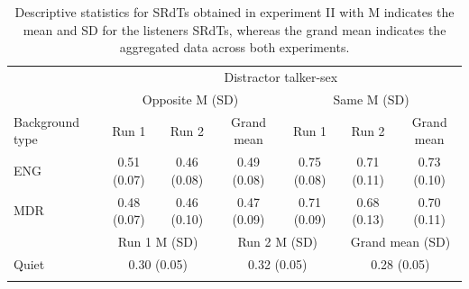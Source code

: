 \documentclass[a4paper, twoside]{templates/ociamthesis}
\begin{document}
\begin{table}[ht]
\caption{\label{tab:Test-RetestDiscriptive}{Descriptive statistics for SRdTs obtained in experiment II with M indicates the mean and SD for the listeners SRdTs, whereas the grand mean indicates the aggregated data across both experiments.}}
\renewcommand{\arraystretch}{2}
\begin{tabular}{lcccccc}
\hline \hline
                & \multicolumn{6}{c}{Distractor talker-sex}                                                      \\
                & \multicolumn{3}{c}{Opposite M (SD)}            & \multicolumn{3}{c}{Same M (SD)}                    \\ \cline{2-7} 
Background type & Run 1           & Run 2          & Grand mean      & Run 1          & Run 2             & Grand mean        \\ \hline
ENG             & 0.51 (0.07)     & 0.46 (0.08)    & 0.49 (0.08)     & 0.75 (0.08)    & 0.71 (0.11)       & 0.73 (0.10)       \\
MDR             & 0.48 (0.07)     & 0.46 (0.10)    & 0.47 (0.09)     & 0.71 (0.09)    & 0.68 (0.13)       & 0.70 (0.11)       \\ \hline
                & \multicolumn{2}{c}{Run 1 M (SD)} & \multicolumn{2}{c}{Run 2 M (SD)} & \multicolumn{2}{c}{Grand mean (SD)} \\ \cline{2-7} 
Quiet           & \multicolumn{2}{c}{0.30 (0.05)}  & \multicolumn{2}{c}{0.32 (0.05)}  & \multicolumn{2}{c}{0.28 (0.05)}       \\ \hline \hline
\\
\end{tabular}
\end{table}
\end{document}
